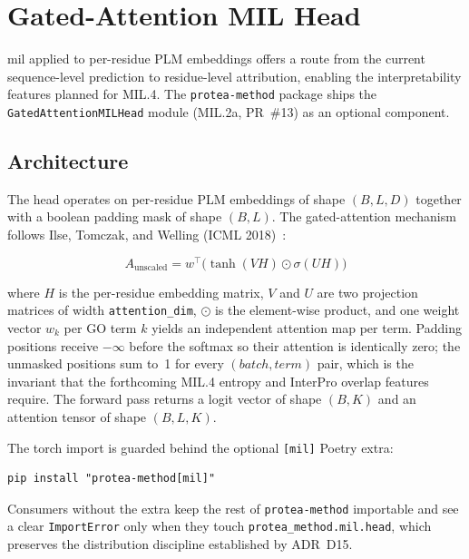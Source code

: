 \section{Gated-Attention MIL Head}
\label{sec:mil-head}

\Gls{mil} applied to per-residue PLM embeddings offers
a route from the current sequence-level prediction to residue-level attribution,
enabling the interpretability features planned for MIL.4. The
\texttt{protea-method} package ships the \texttt{GatedAttentionMILHead}
module (MIL.2a, PR~\#13) as an optional component.

\subsection{Architecture}
\label{subsec:mil-architecture}

The head operates on per-residue PLM embeddings of shape $(B, L, D)$ together
with a boolean padding mask of shape $(B, L)$. The gated-attention mechanism
follows Ilse, Tomczak, and Welling (ICML 2018)~\cite{ilse2018attention}:

\begin{equation}
  A_{\text{unscaled}} = w^\top \bigl(\tanh(V H) \odot \sigma(U H)\bigr)
\end{equation}

where $H$ is the per-residue embedding matrix, $V$ and $U$ are two
projection matrices of width \texttt{attention\_dim}, $\odot$ is the
element-wise product, and one weight vector $w_k$ per GO term $k$ yields an
independent attention map per term. Padding positions receive $-\infty$ before
the softmax so their attention is identically zero; the unmasked positions sum
to~1 for every $(batch, term)$ pair, which is the invariant that the
forthcoming MIL.4 entropy and InterPro overlap features require. The forward
pass returns a logit vector of shape $(B, K)$ and an attention tensor of shape
$(B, L, K)$.

The torch import is guarded behind the optional \texttt{[mil]} Poetry extra:

\begin{lstlisting}[caption={Opt-in install for the MIL head.}]
pip install "protea-method[mil]"
\end{lstlisting}

Consumers without the extra keep the rest of \texttt{protea-method}
importable and see a clear \texttt{ImportError} only when they touch
\texttt{protea\_method.mil.head}, which preserves the distribution
discipline established by ADR~D15.

